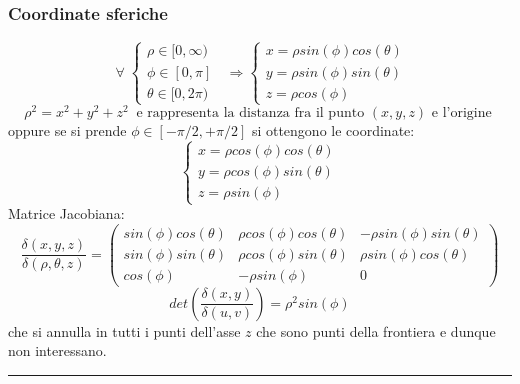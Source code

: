 \subsubsection{Coordinate sferiche}
\[
    \;\forall\; \begin{cases}
        \rho \in [0,\infty)\\
        \phi \in [0,\pi]\\
        \theta \in [0,2\pi)
    \end{cases} \;\; \Longrightarrow \begin{cases}
        x = \rho sin(\phi) cos(\theta)\\
        y = \rho sin(\phi) sin(\theta)\\
        z = \rho cos(\phi)
    \end{cases}
\]
\[
    \rho^2 = x^2 +y^2+z^2 \;\; \text{e rappresenta la distanza fra il punto $(x,y,z)$ e l'origine}\;
\]
oppure se si prende $\phi \in [-\pi /2, + \pi/2]$ si ottengono le coordinate:
\[
    \begin{cases}
        x = \rho cos(\phi) cos(\theta)\\
        y = \rho cos(\phi) sin(\theta)\\
        z = \rho sin(\phi)
    \end{cases}
\]
Matrice Jacobiana:
\[
    \frac{\delta(x,y,z)}{\delta(\rho,\theta,z)} = \left(
        \begin{matrix}
            sin(\phi) cos(\theta) & \rho cos(\phi) cos(\theta) & -\rho sin(\phi) sin(\theta)\\ 
            sin(\phi) sin(\theta) & \rho cos(\phi) sin(\theta) & \rho sin(\phi) cos(\theta) \\ 
            cos(\phi) & -\rho sin(\phi) & 0
        \end{matrix}\right)
\]
\[
    det(\frac{\delta(x,y)}{\delta(u,v)}) = \rho^2 sin(\phi)
\]
che si annulla in tutti i punti dell'asse $z$ che sono punti della frontiera e dunque non interessano.\newline
\rule{\textwidth}{2pt}
